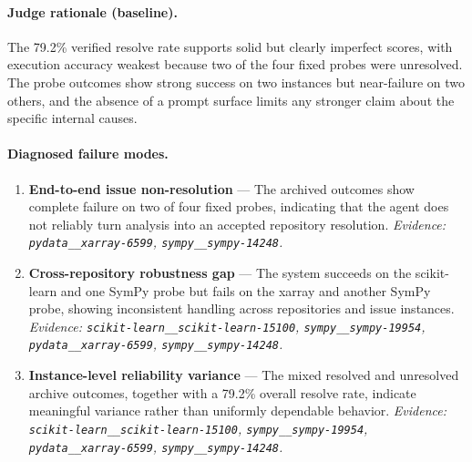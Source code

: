 \paragraph{Judge rationale (baseline).}
The 79.2\% verified resolve rate supports solid but clearly imperfect scores, with execution accuracy weakest because two of the four fixed probes were unresolved. The probe outcomes show strong success on two instances but near-failure on two others, and the absence of a prompt surface limits any stronger claim about the specific internal causes.
\paragraph{Diagnosed failure modes.}\begin{enumerate}\itemsep1pt
\item \textbf{End-to-end issue non-resolution} --- The archived outcomes show complete failure on two of four fixed probes, indicating that the agent does not reliably turn analysis into an accepted repository resolution. \emph{Evidence: \texttt{pydata\_\_xarray-6599}, \texttt{sympy\_\_sympy-14248}.}
\item \textbf{Cross-repository robustness gap} --- The system succeeds on the scikit-learn and one SymPy probe but fails on the xarray and another SymPy probe, showing inconsistent handling across repositories and issue instances. \emph{Evidence: \texttt{scikit-learn\_\_scikit-learn-15100}, \texttt{sympy\_\_sympy-19954}, \texttt{pydata\_\_xarray-6599}, \texttt{sympy\_\_sympy-14248}.}
\item \textbf{Instance-level reliability variance} --- The mixed resolved and unresolved archive outcomes, together with a 79.2\% overall resolve rate, indicate meaningful variance rather than uniformly dependable behavior. \emph{Evidence: \texttt{scikit-learn\_\_scikit-learn-15100}, \texttt{sympy\_\_sympy-19954}, \texttt{pydata\_\_xarray-6599}, \texttt{sympy\_\_sympy-14248}.}
\end{enumerate}
